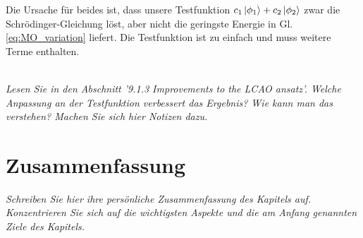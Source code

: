 Die Ursache für beides ist, dass unsere Testfunktion $c_1 \ket{\phi_1} + c_2 \ket{\phi_2}$ zwar die Schrödinger-Gleichung löst, aber nicht die geringste Energie in Gl. \ref{eq:MO_variation} liefert. Die Testfunktion ist zu einfach und muss weitere Terme enthalten.

\ \\

\textit{Lesen Sie in \cite{Demtröder_AMP}  den Abschnitt '9.1.3 Improvements to the LCAO ansatz'. Welche Anpassung an der Testfunktion verbessert das Ergebnis? Wie kann man das verstehen? Machen Sie sich hier Notizen dazu.
}

\vspace*{10cm}


\newpage

\section{Zusammenfassung}

\textit{Schreiben Sie hier ihre persönliche Zusammenfassung des Kapitels auf. Konzentrieren Sie sich auf die wichtigsten Aspekte und die am Anfang genannten Ziele des Kapitels.}


\vspace*{10cm}


\printbibliography[segment=\therefsegment,heading=subbibliography]

